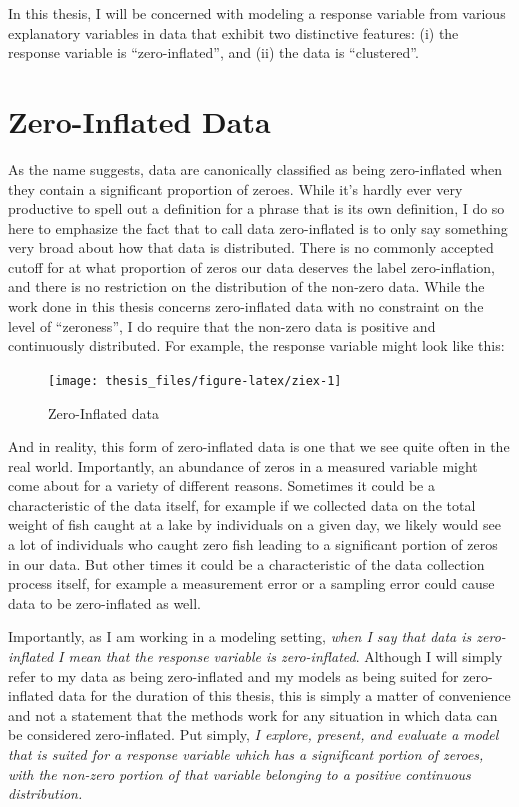 \documentclass[12pt,twoside]{reedthesis}
\begin{document}
In this thesis, I will be concerned with modeling a response variable from various explanatory variables in data that exhibit two distinctive features: (i) the response variable is ``zero-inflated'', and (ii) the data is ``clustered''.

\hypertarget{zero-inflated-data}{%
\section{Zero-Inflated Data}\label{zero-inflated-data}}

As the name suggests, data are canonically classified as being zero-inflated when they contain a significant proportion of zeroes. While it's hardly ever very productive to spell out a definition for a phrase that is its own definition, I do so here to emphasize the fact that to call data zero-inflated is to only say something very broad about how that data is distributed. There is no commonly accepted cutoff for at what proportion of zeros our data deserves the label zero-inflation, and there is no restriction on the distribution of the non-zero data. While the work done in this thesis concerns zero-inflated data with no constraint on the level of ``zeroness'', I do require that the non-zero data is positive and continuously distributed. For example, the response variable might look like this:
\begin{figure}

{\centering \texttt{[image: thesis\_files/figure-latex/ziex-1]} 

}

\caption{Zero-Inflated data}\label{fig:ziex}
\end{figure}
And in reality, this form of zero-inflated data is one that we see quite often in the real world. Importantly, an abundance of zeros in a measured variable might come about for a variety of different reasons. Sometimes it could be a characteristic of the data itself, for example if we collected data on the total weight of fish caught at a lake by individuals on a given day, we likely would see a lot of individuals who caught zero fish leading to a significant portion of zeros in our data. But other times it could be a characteristic of the data collection process itself, for example a measurement error or a sampling error could cause data to be zero-inflated as well.

Importantly, as I am working in a modeling setting, \emph{when I say that data is zero-inflated I mean that the response variable is zero-inflated}. Although I will simply refer to my data as being zero-inflated and my models as being suited for zero-inflated data for the duration of this thesis, this is simply a matter of convenience and not a statement that the methods work for any situation in which data can be considered zero-inflated. Put simply, \emph{I explore, present, and evaluate a model that is suited for a response variable which has a significant portion of zeroes, with the non-zero portion of that variable belonging to a positive continuous distribution.}
\end{document}
